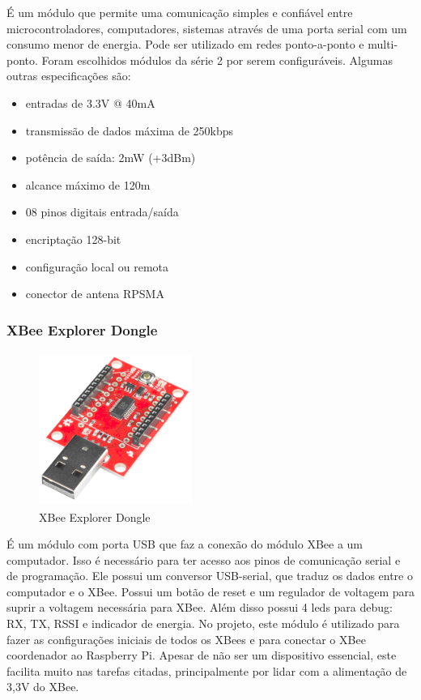 É um módulo que permite uma comunicação simples e confiável entre microcontroladores, computadores, sistemas através de uma porta serial com um consumo menor de energia. Pode ser utilizado em redes ponto-a-ponto e multi-ponto. Foram escolhidos módulos da série 2 por serem configuráveis.
Algumas outras especificações são:

\begin{itemize}
\item{entradas de 3.3V @ 40mA}
\item{transmissão de dados máxima de 250kbps}
\item{potência de saída: 2mW (+3dBm)}
\item{alcance máximo de 120m}
\item{08 pinos digitais entrada/saída}
\item{encriptação 128-bit}
\item{configuração local ou remota}
\item{conector de antena RPSMA}
\end{itemize}
%
\subsubsection{XBee Explorer Dongle}
\begin{figure}[H]
\begin{center}
\includegraphics[width=5cm,height=5cm,keepaspectratio]{figuras/xbee_explorer_dongle.png}
\caption{\label{fig:xbee explorer dongle} XBee Explorer Dongle}
\end{center}
\end{figure}

É um módulo com porta USB que faz a conexão do módulo XBee a um computador. Isso é necessário para ter acesso aos pinos de comunicação serial e de programação. Ele possui um conversor USB-serial, que traduz os dados entre o computador e o XBee. Possui um botão de reset e um regulador de voltagem para suprir a voltagem necessária para XBee. Além disso possui 4 leds para debug: RX, TX, RSSI e indicador de energia. No projeto, este módulo é utilizado para fazer as configurações iniciais de todos os XBees e para conectar o XBee coordenador ao Raspberry Pi. Apesar de não ser um dispositivo essencial, este facilita muito nas tarefas citadas,  principalmente por lidar com a alimentação de 3,3V do XBee.

